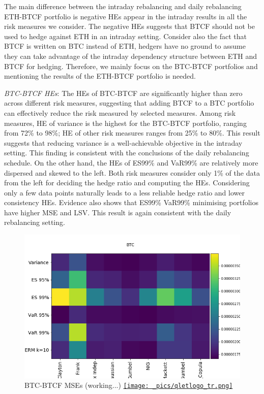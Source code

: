 \documentclass[11pt,a4paper,english]{article}
\begin{document}
The main difference between the intraday rebalancing and daily rebalancing ETH-BTCF portfolio is negative HEs appear in the intraday results in all the risk measures we consider.
The negative HEs suggests that BTCF should not be used to hedge against ETH in an intraday setting.
Consider also the fact that BTCF is written on BTC instead of ETH, hedgers have no ground to assume they can take advantage of the intraday dependency structure between ETH and BTCF for hedging.
Therefore, we mainly focus on the BTC-BTCF portfolios and mentioning the results of the ETH-BTCF portfolio is needed.


\textit{BTC-BTCF HEs}: The HEs of BTC-BTCF are significantly higher than zero across different risk measures, suggesting that adding BTCF to a BTC portfolio can effectively reduce the risk measured by selected measures.
Among risk measures, HE of variance is the highest for the BTC-BTCF portfolio, ranging from 72\% to 98\%;
HE of other risk measures ranges from 25\% to 80\%.
This result suggests that reducing variance is a well-achievable objective in the intraday setting.
This finding is consistent with the conclusions of the daily rebalancing schedule. On the other hand, the HEs of ES99\% and VaR99\% are relatively more dispersed and skewed to the left.
Both risk measures consider only 1\% of the data from the left for deciding the hedge ratio and computing the HEs.
Considering only a few data points naturally leads to a less reliable hedge ratio and lower consistency HEs.
Evidence also shows that ES99\% VaR99\% minimising portfolios have higher MSE and LSV.
This result is again consistent with the daily rebalancing setting.

\begin{figure}[t]
\includegraphics[width=\textwidth]{_pics/revision_BTC_MSEs.png}
  \caption{BTC-BTCF MSEs (working...)
  \href{http://www.quantlet.com/}{\texttt{[image: \_pics/qletlogo\_tr.png]}} }
\label{fig:BTC_MSE}
\end{figure}
\end{document}
